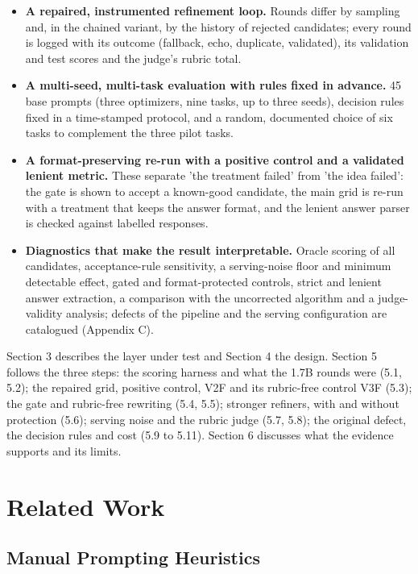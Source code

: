 \documentclass{ieeeaccess}
\begin{document}
\begin{itemize}
\item \textbf{A repaired, instrumented refinement loop.} Rounds differ by sampling and, in the chained variant, by the history of rejected candidates; every round is logged with its outcome (fallback, echo, duplicate, validated), its validation and test scores and the judge's rubric total.
\item \textbf{A multi-seed, multi-task evaluation with rules fixed in advance.} 45 base prompts (three optimizers, nine tasks, up to three seeds), decision rules fixed in a time-stamped protocol, and a random, documented choice of six tasks to complement the three pilot tasks.
\item \textbf{A format-preserving re-run with a positive control and a validated lenient metric.} These separate 'the treatment failed' from 'the idea failed': the gate is shown to accept a known-good candidate, the main grid is re-run with a treatment that keeps the answer format, and the lenient answer parser is checked against labelled responses.
\item \textbf{Diagnostics that make the result interpretable.} Oracle scoring of all candidates, acceptance-rule sensitivity, a serving-noise floor and minimum detectable effect, gated and format-protected controls, strict and lenient answer extraction, a comparison with the uncorrected algorithm and a judge-validity analysis; defects of the pipeline and the serving configuration are catalogued (Appendix C).
\end{itemize}

Section 3 describes the layer under test and Section 4 the design. Section 5 follows the three steps: the scoring harness and what the 1.7B rounds were (5.1, 5.2); the repaired grid, positive control, V2F and its rubric-free control V3F (5.3); the gate and rubric-free rewriting (5.4, 5.5); stronger refiners, with and without protection (5.6); serving noise and the rubric judge (5.7, 5.8); the original defect, the decision rules and cost (5.9 to 5.11). Section 6 discusses what the evidence supports and its limits.

\section{Related Work}

\subsection{Manual Prompting Heuristics}
\end{document}
